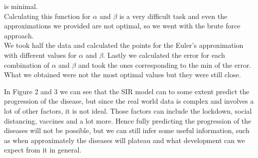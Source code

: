 is minimal.\\

Calculating this function for $\alpha$ and $\beta$ is a very difficult task and even the 
approximations we provided are not optimal, so we went with the brute force approach.\\
We took half the data and calculated the points for the Euler's approximation with different values for 
$\alpha$ and $\beta$. Lastly we calculated the error for each combination of $\alpha$ and $\beta$ and took 
the ones corresponding to the min of the error. What we obtained were not the most optimal values but they were still 
close. 

In Figure 2 and 3 we can see that the SIR model can to some extent predict the progression of the disease, but since the 
real world data is complex and involves a lot of other factors, it is not ideal. Those factors can include the lockdown, social distancing,
vaccines and a lot more. Hence fully predicting the progression of the diseases will not be possible, but we can still infer some useful information,
such as when approximately the diseases will plateau and what development can we expect from it in general. 